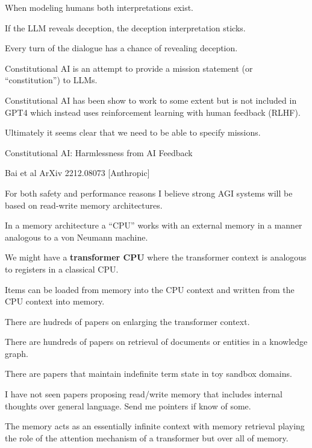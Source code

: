 {\vfill
When modeling humans both interpretations exist.

\vfill
If the LLM reveals deception, the deception interpretation sticks.

\vfill
Every turn of the dialogue has a chance of revealing deception.




Constitutional AI is an attempt to provide a mission statement (or ``constitution'') to LLMs.

\vfill
Constitutional AI has been show to work to some extent but is not included in GPT4 which instead uses reinforcement learning with human feedback (RLHF).

\vfill
Ultimately it seems clear that we need to be able to specify missions.

\centerline{\huge Constitutional AI: Harmlessness from AI Feedback}
\centerline{\huge Bai et al ArXiv 2212.08073 [Anthropic]}


For both safety and performance reasons I believe strong AGI systems will be based on read-write memory architectures.

\vfill
In a memory architecture a ``CPU'' works with an external memory in a manner analogous to a von Neumann machine.

\vfill
We might have a {\bf transformer CPU} where the transformer context is analogous to registers in a classical CPU.

\vfill
Items can be loaded from memory into the CPU context and written from the CPU context into memory.


There are hudreds of papers on enlarging the transformer context.

\vfill
There are hundreds of papers on retrieval of documents or entities in a knowledge graph.

\vfill
There are papers that maintain indefinite term state in toy sandbox domains.

\vfill
I have not seen papers proposing read/write memory that includes internal thoughts over general language.  Send me pointers if know of some.


The memory acts as an essentially infinite context with memory retrieval playing the role of the attention mechanism of a transformer
but over all of memory.

}
